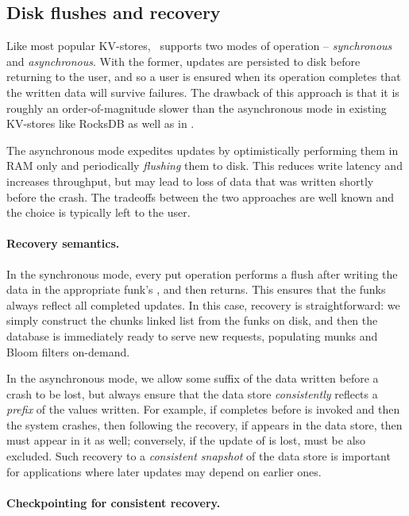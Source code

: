 \subsection{Disk flushes and recovery}
\label{ssec:flush-recovery}

Like most popular KV-stores, \sys\ supports two modes of operation -- \emph{synchronous} and \emph{asynchronous}. 
With the former,  updates are persisted to disk before returning to the user, and so a user is ensured when its operation
completes that the written data will survive failures. The drawback of this approach is that it is 
roughly an order-of-magnitude slower
than the asynchronous mode in  existing KV-stores like RocksDB as well as in \sys. 

The asynchronous mode expedites updates by optimistically performing them in
RAM only and periodically \emph{flushing} them to disk. This reduces write latency and increases throughput, but 
may lead to loss of data that was written shortly before the crash. The tradeoffs between the two approaches are 
well known and the choice is typically left to the user.

\paragraph{Recovery semantics.}
In the synchronous mode, every put operation performs a flush after writing the data in the appropriate funk's , and then returns. 
This ensures that the funks always reflect all completed updates. In this case, recovery is straightforward: we simply construct
the chunks linked list from the funks on disk, and then the database is immediately ready to serve new requests, populating munks and Bloom filters on-demand.  

In the asynchronous mode, we allow some suffix of the  data written before a crash to be lost, but always 
ensure that the data store \emph{consistently} reflects a \emph{prefix} of the  values written.
For example, if  completes before  
is invoked and then the system crashes, then following the recovery, 
if  appears in the data store, then  must appear in it as well; 
conversely, if the update of   is lost,   must be also excluded.
Such recovery to a \emph{consistent snapshot} of the data store is important for applications where later updates may depend on earlier ones. 

\paragraph{Checkpointing for consistent recovery.}

